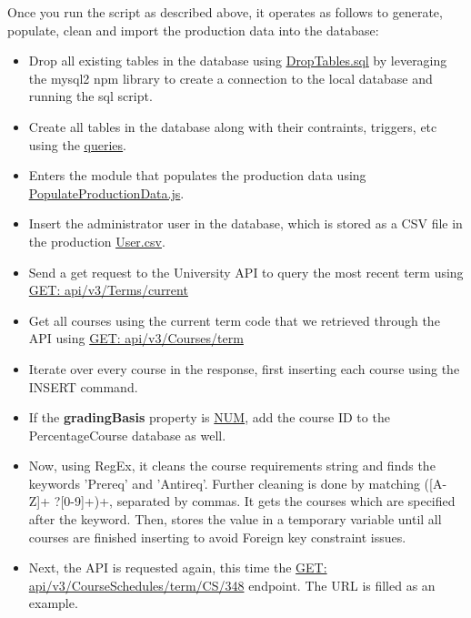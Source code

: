 \documentclass[12pt, a4paper]{article}
\begin{document}
Once you run the script as described above, it operates as follows to generate, populate, clean and import the production data into the database:
\begin{itemize}
    \item Drop all existing tables in the database using \underline{\href{https://github.com/Kggupta/DegreeMap/blob/main/Database/Queries/DropTables.sql}{DropTables.sql}} by leveraging the mysql2 npm library to create a connection to the local database and running the sql script.
    \item Create all tables in the database along with their contraints, triggers, etc using the \underline{\href{https://github.com/Kggupta/DegreeMap/blob/main/Database/Queries}{queries}}.
    \item Enters the module that populates the production data using \underline{\href{https://github.com/Kggupta/DegreeMap/blob/main/Database/src/PopulateProductionData.js}{PopulateProductionData.js}}.
    \item Insert the administrator user in the database, which is stored as a CSV file in the production \underline{\href{https://github.com/Kggupta/DegreeMap/blob/main/Database/DataFiles/Prod/User.csv}{User.csv}}.
    \item Send a get request to the University API to query the most recent term using \href{https://openapi.data.uwaterloo.ca/v3/Terms/current}{GET: api/v3/Terms/current}
    \item Get all courses using the current term code that we retrieved through the API using \href{https://openapi.data.uwaterloo.ca/v3/Courses/1235}{GET: api/v3/Courses/term}
    \item Iterate over every course in the response, first inserting each course using the INSERT command.
    \item If the \textbf{gradingBasis} property is \underline{NUM}, add the course ID to the PercentageCourse database as well.
    \item Now, using RegEx, it cleans the course requirements string and finds the keywords 'Prereq' and 'Antireq'. Further cleaning is done by matching ([A-Z]+ ?[0-9]+)+, separated by commas. It gets the courses which are specified after the keyword. Then, stores the value in a temporary variable until all courses are finished inserting to avoid Foreign key constraint issues.
    \item Next, the API is requested again, this time the \href{https://openapi.data.uwaterloo.ca/v3/CourseSchedules/term/subject/coursenumber}{GET: api/v3/CourseSchedules/term/CS/348} endpoint. The URL is filled as an example.

\end{itemize}
\end{document}
